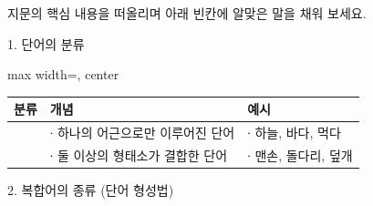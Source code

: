 \documentclass[fs9,seriesRus]{korfarm-base}
\begin{document}
\kfActivityBg \par{}지문의 핵심 내용을 떠올리며 아래 빈칸에 알맞은 말을 채워 보세요.

1. 단어의 분류 

\par\medskip{}
\noindent\begin{adjustbox}{max width=\linewidth, center}
\renewcommand{\arraystretch}{1.45}
\begin{tabular}{|>{\raggedright\arraybackslash}p{}|>{\raggedright\arraybackslash}p{}|>{\raggedright\arraybackslash}p{}|}
\hline
\rowcolor{kfPrimaryLight!50}\textbf{\color{kfPrimary} 분류} & \textbf{\color{kfPrimary} 개념} & \textbf{\color{kfPrimary} 예시} \\\hline
[ ① ] & ∙ 하나의 어근으로만 이루어진 단어 & ∙ 하늘, 바다, 먹다 \\\hline
[ ② ] & ∙ 둘 이상의 형태소가 결합한 단어 & ∙ 맨손, 돌다리, 덮개 \\\hline
\end{tabular}
\end{adjustbox}\par\medskip



2. 복합어의 종류 (단어 형성법) 
\end{document}

